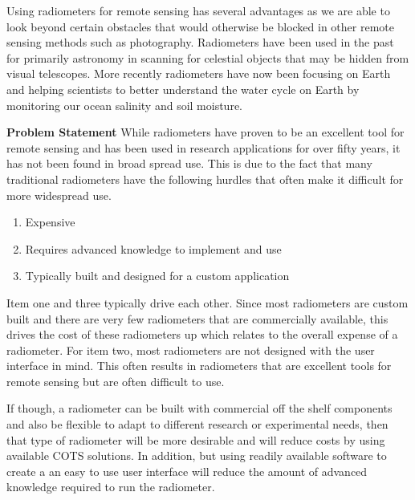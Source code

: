 Using radiometers for remote sensing has several advantages as we are able to look beyond certain obstacles that would otherwise be blocked in other remote sensing methods such as photography.  Radiometers have been used in the past for primarily astronomy in scanning for celestial objects that may be hidden from visual telescopes.  More recently radiometers have now been focusing on Earth and helping scientists to better understand the water cycle on Earth by monitoring our ocean salinity and soil moisture.  

\textbf{Problem Statement}
While radiometers have proven to be an excellent tool for remote sensing and has been used in research applications for over fifty years, it has not been found in broad spread use.  This is due to the fact that many traditional radiometers have the following hurdles that often make it difficult for more widespread use.

\begin{enumerate}
\item Expensive
\item Requires advanced knowledge to implement and use
\item Typically built and designed for a custom application
\end{enumerate}

Item one and three typically drive each other.  Since most radiometers are custom built and there are very few radiometers that are commercially available, this drives the cost of these radiometers up which relates to the overall expense of a radiometer.  For item two, most radiometers are not designed with the user interface in mind.  This often results in radiometers that are excellent tools for remote sensing but are often difficult to use.

If though, a radiometer can be built with commercial off the shelf components and also be flexible to adapt to different research or experimental needs, then that type of radiometer will be more desirable and will reduce costs by using available COTS solutions.  In addition, but using readily available software to create a an easy to use user interface will reduce the amount of advanced knowledge required to run the radiometer.

